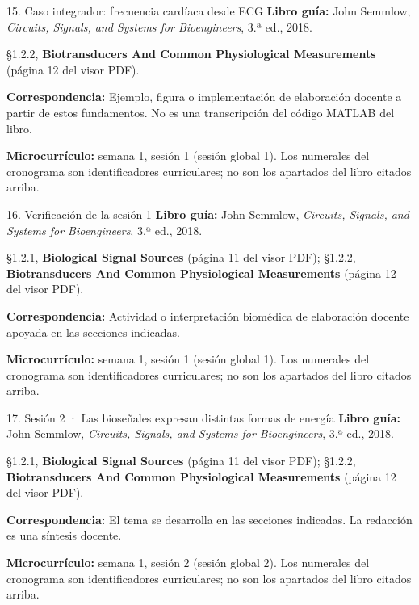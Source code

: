 \documentclass[
  10pt,
  ignorenonframetext,
  aspectratio=169,
  spanish,
]{beamer}
\begin{document}
\begin{frame}{15. Caso integrador: frecuencia cardíaca desde ECG}
\label{caso-integrador-frecuencia-carduxedaca-desde-ecg}
\textbf{Libro guía:} John Semmlow, \emph{Circuits, Signals, and Systems
for Bioengineers}, 3.ª ed., 2018.

§1.2.2, \textbf{Biotransducers And Common Physiological Measurements}
(página 12 del visor PDF).

\textbf{Correspondencia:} Ejemplo, figura o implementación de
elaboración docente a partir de estos fundamentos. No es una
transcripción del código MATLAB del libro.

\textbf{Microcurrículo:} semana 1, sesión 1 (sesión global 1). Los
numerales del cronograma son identificadores curriculares; no son los
apartados del libro citados arriba.
\end{frame}

\begin{frame}{16. Verificación de la sesión 1}
\label{verificaciuxf3n-de-la-sesiuxf3n-1}
\textbf{Libro guía:} John Semmlow, \emph{Circuits, Signals, and Systems
for Bioengineers}, 3.ª ed., 2018.

§1.2.1, \textbf{Biological Signal Sources} (página 11 del visor PDF);
§1.2.2, \textbf{Biotransducers And Common Physiological Measurements}
(página 12 del visor PDF).

\textbf{Correspondencia:} Actividad o interpretación biomédica de
elaboración docente apoyada en las secciones indicadas.

\textbf{Microcurrículo:} semana 1, sesión 1 (sesión global 1). Los
numerales del cronograma son identificadores curriculares; no son los
apartados del libro citados arriba.
\end{frame}

\begin{frame}{17. Sesión 2 · Las bioseñales expresan distintas formas de
energía}
\label{sesiuxf3n-2-las-bioseuxf1ales-expresan-distintas-formas-de-energuxeda}
\textbf{Libro guía:} John Semmlow, \emph{Circuits, Signals, and Systems
for Bioengineers}, 3.ª ed., 2018.

§1.2.1, \textbf{Biological Signal Sources} (página 11 del visor PDF);
§1.2.2, \textbf{Biotransducers And Common Physiological Measurements}
(página 12 del visor PDF).

\textbf{Correspondencia:} El tema se desarrolla en las secciones
indicadas. La redacción es una síntesis docente.

\textbf{Microcurrículo:} semana 1, sesión 2 (sesión global 2). Los
numerales del cronograma son identificadores curriculares; no son los
apartados del libro citados arriba.
\end{frame}
\end{document}
